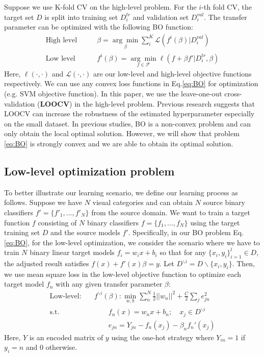 Suppose we use K-fold CV on the high-level problem. For the $i$-th fold CV, the target set $D$ is split into training set $D_i^{tr}$ and validation set $D_i^{val}$. The transfer parameter can be optimized with the following BO function:
\begin{equation}\label{eq:BO}
\begin{aligned}
\text{High level}\qquad&\beta=\underset{\beta}{\arg \min}\sum_i^K\mathcal{L}(f^{i}(\beta)|D_i^{val})\\
\text{Low level}\qquad&f^{i}(\beta)=\underset{f \in \mathcal{F}}{\arg \min}\ell\left(f+\beta f'|D_i^{tr},\beta\right) 
\end{aligned}
\end{equation} 
Here, $\ell(\cdot,\cdot)$ and $\mathcal{L}(\cdot,\cdot)$ are our low-level and high-level objective functions respectively. We can use any convex loss functions in Eq.\eqref{eq:BO} for optimization (e.g. SVM objective function). In this paper, we use the leave-one-out cross-validation (\textbf{LOOCV}) in the high-level problem. Previous research \cite{kuzborskij2013stability} suggests that LOOCV can increase the robustness of the estimated hyperparameter especially on the small dataset.
In previous studies\cite{maclaurin2015gradient,Pedregosa16}, BO is a non-convex problem and can only obtain the local optimal solution. However, we will show that problem \eqref{eq:BO} is strongly convex and we are able to obtain its optimal solution. 
\subsection{Low-level optimization problem}
To better illustrate our learning scenario, we define our learning process as follows. Suppose we have $N$ visual categories and 
can obtain $N$ source binary classifiers $f'=\{f'_1,...,f'_N\}$ from the source domain. We want to train a target function $f$ consisting of $N$ binary classifiers $f=\{f_1,...,f_N\}$ using the target training set $D$ and the source models $f'$.
Specifically, in our BO problem Eq. \eqref{eq:BO}, for the low-level optimization, we consider the scenario where we have to train $N$ binary linear target models $f_i = w_ix+b_i$ so that for any $\{x_i,y_i\}_{i=1}^l \in D$, the adjusted result satisfies $f(x)+f'(x)\beta = y$. Let $D^{\backslash i} = D\backslash\{x_i,y_i\}$.
Then, we use mean square loss in the low-level objective function to optimize each target model $f_n$ with any given transfer parameter $\beta$:
\begin{equation}\label{eq:bo_low}
\begin{aligned}
\text{Low-level:}\quad&f^{\backslash i}(\beta) : \underset{w,b}{\min} \sum_n^N\frac{1}{2}||w_n||^2+\frac{C}{2}\sum_je^2_{jn}\\
\text{s.t.} &\qquad f_n(x) = w_nx+b_n; \quad x_j \in D^{\backslash i}\\
&\qquad e_{jn} = Y_{jn}-f_n(x_j)-\beta_n f_n'(x_j)
\end{aligned}
\end{equation}
Here, $Y$ is an encoded matrix of $y$ using the one-hot strategy where $Y_{in} =1$ if $y_i=n$ and 0 otherwise.

